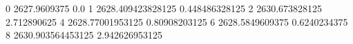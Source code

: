 0 2627.9609375 0.0
1 2628.409423828125 0.448486328125
2 2630.673828125 2.712890625
4 2628.77001953125 0.80908203125
6 2628.5849609375 0.6240234375
8 2630.903564453125 2.942626953125
